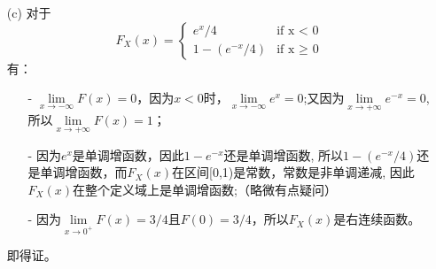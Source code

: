 \documentclass [12pt]{article}
\begin{document}
\begin{CJK*}{GBK}{kai}
\begin{enumerate}
求$F_{X}^{-1}(y)$：\\
有当$x \in (- \infty , 0)$时, 有$y \in [0,1/2]$，$y=e^x / 2 $（疑问2）
 $\Leftrightarrow$\\
 $e^x=2y $
 $\Leftrightarrow$\\
 $\ln{e^x}=\ln{(2y)} $
$\Leftrightarrow$\\
 $x= \ln{(2y)} $\\
 即，当$y \in [0,1/2]$时，$F_{X}^{-1}(y)= \ln{2y}$\\
 当$x \in [1 , + \infty)$时, 有$y \in [1/2,1)$，$y= 1- (e^{1-x} / 2) $
$\Leftrightarrow$\\
 $e^{1-x} =2(1-y) $
 $\Leftrightarrow$\\
 $\ln{e^{1-x}}=\ln{(2(1-y))} $
$\Leftrightarrow$\\
 $1-x= \ln{(2(1-y))} $\\
 $\Leftrightarrow$\\
 $x=1 - \ln{(2(1-y))} $\\
 即，当$y \in [1/2,1)$时，$F_{X}^{-1}(y)=1 - \ln{(2(1-y))} $\\
故，$$F_{X}^{-1}(y)=
\begin{cases}
ln{(2y)} & \text{if y $\in$ [0,1/2]}\\
1 - ln{(2(1-y))} & \text{if y $\in$ [1/2,1)}
\end{cases}$$
  \item[(c)]  对于
$$F_{X}(x)=
\begin{cases}
e^x / 4 & \text{if x < 0}\\
1- (e^{-x} / 4) & \text{if x $\ge$ 0}
\end{cases}$$
有：
\begin{itemize}
\item[-] $\lim\limits_{x \to -\infty }F(x) = 0$，因为$x<0$时，$\lim\limits_{x \to -\infty }e^x = 0$;又因为$\lim\limits_{x \to +\infty }e^{-x} = 0$, 所以$\lim\limits_{x \to +\infty }F(x) = 1$；
\item[-] 因为$e^x$是单调增函数，因此$1 - e^{-x}$还是单调增函数, 所以$1- (e^{-x} / 4)$还是单调增函数，而$F_{X}(x)$在区间[0,1)是常数，常数是非单调递减,  因此$F_{X}(x)$在整个定义域上是单调增函数;（略微有点疑问）
\item[-] 因为$\lim\limits_{x \to 0^{+} }F(x) = 3/4$且$F(0) = 3/4$，所以$F_{X}(x)$是右连续函数。
\end{itemize}
即得证。


\end{enumerate}
\end{CJK*}
\end{document}
